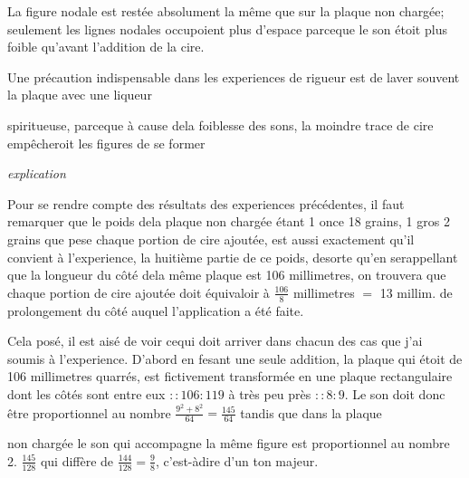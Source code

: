 \documentclass[11pt,a4paper]{article}
\begin{document}
La figure nodale est restée absolument la même
que sur la plaque non chargée; seulement les
lignes nodales occupoient plus d'espace parceque
le son étoit plus foible qu'avant l'addition de
la cire.

Une précaution indispensable dans les experiences de rigueur
est de laver souvent la plaque avec une liqueur


spiritueuse, parceque à cause dela foiblesse des sons, la
moindre trace de cire 
empêcheroit les figures de se former

\emph{explication}

Pour se rendre compte des  résultats des experiences précédentes,
il faut remarquer que le poids dela plaque non chargée
étant 1 once 18 grains, 1 gros 2 grains que pese chaque
portion de cire ajoutée, est aussi exactement qu'il
convient à l'experience, la huitième partie de ce poids,
desorte qu'en serappellant que la longueur du côté
dela même plaque est 106 millimetres, on
trouvera que chaque portion de cire ajoutée
doit équivaloir à $\frac{106}{8}$ millimetres $=$  13 millim.
de prolongement du côté auquel l'application
a été faite.

Cela posé, il est aisé de voir cequi doit arriver
dans chacun des cas que j'ai soumis à l'experience.
D'abord en fesant une seule addition, la plaque
qui étoit de 106 millimetres quarrés, est fictivement
transformée en une plaque rectangulaire dont les
côtés sont entre eux $:: 106 : 119$ à très peu près
$:: 8 : 9$. Le son doit donc être proportionnel au
nombre $\frac{9^2+8^2}{64} = \frac{145}{64}$ tandis que dans la plaque


non chargée le son qui accompagne la même figure
est proportionnel au nombre 2.  
  $\frac{145}{128}$ qui  diffère   
de  $\frac{144}{128} = \frac{9}{8}$, c'est-àdire d'un ton majeur.
\end{document}
